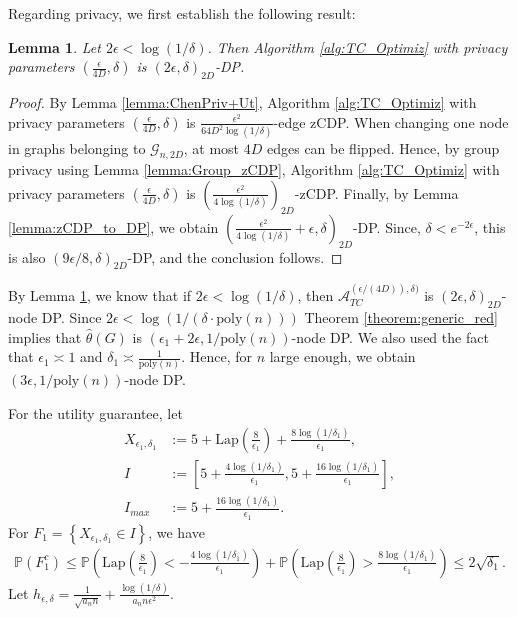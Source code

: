 \documentclass{article}
\newtheorem{lemma}{Lemma}
\newcommand{\thetahat}{\ensuremath{\widehat{\theta}}}
\begin{document}
Regarding privacy, we first establish the following result:

\begin{lemma}
\label{lemma:TwoBD_Priv}
Let $2\epsilon < \log(1/\delta)$. Then Algorithm \ref{alg:TC_Optimiz} with privacy parameters $\left(\frac{\epsilon}{4D}, \delta\right)$ is $(2\epsilon, \delta)_{2D}$-DP.
\end{lemma}

\begin{proof}
By Lemma \ref{lemma:ChenPriv+Ut}, Algorithm \ref{alg:TC_Optimiz} with privacy parameters $\left(\frac{\epsilon}{4D}, \delta\right)$ is $\frac{\epsilon^2}{64D^2\log(1/\delta)}$-edge zCDP. When changing one node in graphs belonging to $\mathcal{G}_{n, 2D}$, at most $4D$ edges can be flipped. Hence, by group privacy using Lemma \ref{lemma:Group_zCDP}, Algorithm \ref{alg:TC_Optimiz} with privacy parameters $\left(\frac{\epsilon}{4D}, \delta\right)$ is $\left(\frac{\epsilon^2}{4\log(1/\delta)}\right)_{2D}$-zCDP. Finally, by Lemma \ref{lemma:zCDP_to_DP}, we obtain $\left(\frac{\epsilon^2}{4\log(1/\delta)} + \epsilon, \delta\right)_{2D}$-DP. Since, $\delta < e^{-2\epsilon}$, this is also $(9\epsilon/8, \delta)_{2D}$-DP, and the conclusion follows.
\end{proof}

By Lemma \ref{lemma:TwoBD_Priv}, we know that if $2\epsilon < \log(1/\delta)$, then $\mathcal{A}_{TC}^{(\epsilon/(4D)), \delta)}$ is $(2\epsilon, \delta)_{2D}$-node DP. Since $2\epsilon < \log(1/(\delta\cdot\mathrm{poly}(n)))$ Theorem \ref{theorem:generic_red} implies that $\thetahat(G)$ is $(\epsilon_1 + 2\epsilon, 1/\mathrm{poly}(n))$-node DP. We also used the fact that $\epsilon_1 \asymp 1$ and $\delta_1 \asymp \frac{1}{\mathrm{poly}(n)}$. Hence, for $n$ large enough, we obtain $(3\epsilon, 1/\mathrm{poly}(n))$-node DP.

For the utility guarantee, let
\begin{align*}
X_{\epsilon_1, \delta_1} & := 5 + \mathrm{Lap}\left(\frac{8}{\epsilon_1}\right) + \frac{8\log(1/\delta_1)}{\epsilon_1}, \\
%
I & := \left[5 + \frac{4\log(1/\delta_1)}{\epsilon_1}, 5 + \frac{16\log(1/\delta_1)}{\epsilon_1}\right], \\
%
I_{max} & := 5 + \frac{16\log(1/\delta_1)}{\epsilon_1}.
\end{align*}
For $F_1 = \left\{X_{\epsilon_1, \delta_1} \in I\right\}$, we have
\begin{align*}
 \mathbb{P}\left(F_1^c\right) \leq \mathbb{P}\left(\mathrm{Lap}\left(\frac{8}{\epsilon_1}\right) < -\frac{4\log(1/\delta_1)}{\epsilon_1}\right) + \mathbb{P}\left(\mathrm{Lap}\left(\frac{8}{\epsilon_1}\right) > \frac{8\log(1/\delta_1)}{\epsilon_1}\right) \leq 2\sqrt{\delta_1}.
\end{align*}
Let $h_{\epsilon, \delta} = \frac{1}{\sqrt{a_n n}} + \frac{\log(1/\delta)}{a_n n\epsilon^2}$.
\end{document}
